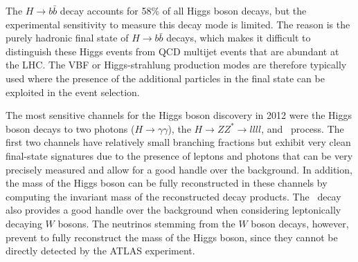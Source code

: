 The $H\rightarrow b\bar{b}$ decay accounts for 58\% of all Higgs boson decays, but the experimental sensitivity to measure this decay mode is limited. The reason is the purely hadronic final state of $H\rightarrow b\bar{b}$ decays, which makes it difficult to distinguish these Higgs events from QCD multijet events that are abundant at the LHC.
The VBF or Higgs-strahlung production modes are therefore typically used where the presence of the additional particles in the final state can be exploited in the event selection.

The most sensitive channels for the Higgs boson discovery in 2012 were the Higgs boson decays to two photons ($H \to \gamma\gamma$), the $H \to ZZ^* \to llll$, and \HWW\ process.
The first two channels have relatively small branching fractions but exhibit very clean final-state signatures due to the presence of leptons and photons that can be very precisely measured and allow for a good handle over the background.
In addition, the mass of the Higgs boson can be fully reconstructed in these channels by computing the invariant mass of the reconstructed decay products.
The \HWW\ decay also provides a good handle over the background when considering leptonically decaying $W$ bosons.
The neutrinos stemming from the $W$ boson decays, however, prevent to fully reconstruct the mass of the Higgs boson, since they cannot be directly detected by the ATLAS experiment.


